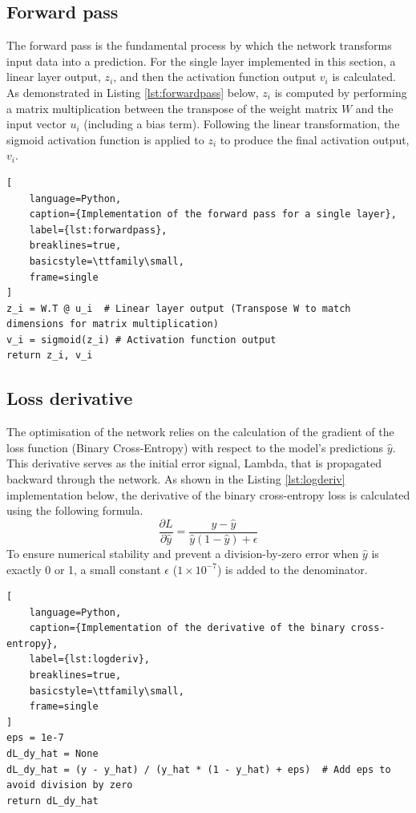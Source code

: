 \documentclass[11pt]{article}
\begin{document}
\subsection*{Forward pass}
The forward pass is the fundamental process by which the network transforms input data into a prediction. For the single layer implemented in this section, 
a linear layer output, $z_i$, and then the activation function output $v_i$ is calculated. As demonstrated in Listing \ref{lst:forwardpass} below, 
$z_i$ is computed by performing a matrix multiplication between the transpose of the weight matrix $W$ and the input vector $u_i$ (including a bias term). 
Following the linear transformation, the sigmoid activation function is applied to $z_i$ to produce the final activation output, $v_i$. 

\newpage
\begin{lstlisting}[
    language=Python, 
    caption={Implementation of the forward pass for a single layer},
    label={lst:forwardpass},
    breaklines=true,
    basicstyle=\ttfamily\small,
    frame=single
]
z_i = W.T @ u_i  # Linear layer output (Transpose W to match dimensions for matrix multiplication)
v_i = sigmoid(z_i) # Activation function output
return z_i, v_i
\end{lstlisting}

\subsection*{Loss derivative}
The optimisation of the network relies on the calculation of the gradient of the loss function (Binary Cross-Entropy) with respect to the model's 
predictions $\hat{y}$. This derivative serves as the initial error signal, Lambda, that is propagated backward through the network.
As shown in the Listing \ref{lst:logderiv} implementation below, the derivative of the binary cross-entropy loss is calculated using the following formula.
\begin{equation}
    \frac{\partial L}{\partial \hat{y}} = \frac{y - \hat{y}}{\hat{y}(1 - \hat{y}) + \epsilon}
    \label{eq:bce_derivative}
\end{equation}
To ensure numerical stability and prevent a division-by-zero error when $\hat{y}$ is exactly 0 or 1, a small constant $\epsilon$ ($1 \times 10^{-7}$) is added to the denominator. 

\begin{lstlisting}[
    language=Python, 
    caption={Implementation of the derivative of the binary cross-entropy},
    label={lst:logderiv},
    breaklines=true,
    basicstyle=\ttfamily\small,
    frame=single
]
eps = 1e-7
dL_dy_hat = None
dL_dy_hat = (y - y_hat) / (y_hat * (1 - y_hat) + eps)  # Add eps to avoid division by zero
return dL_dy_hat
\end{lstlisting}
\end{document}
